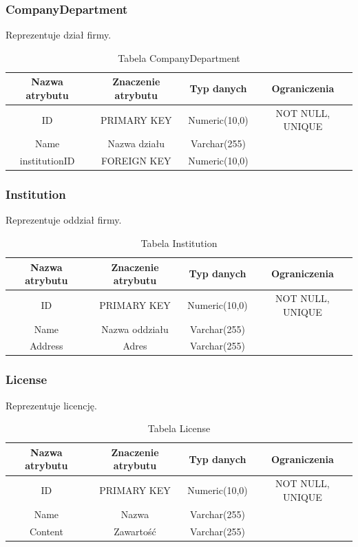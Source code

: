 \subsubsection{CompanyDepartment}
Reprezentuje dział firmy.
\begin{table}[H]
	\renewcommand\arraystretch{1.5}
	\renewcommand\tabcolsep{3pt}
	\begin{tabular}{| c | c | c | c |} 
		\hline \textbf{Nazwa atrybutu} & \textbf{Znaczenie atrybutu} & \textbf{Typ danych} & \textbf{Ograniczenia} \\ 
		\hline ID & PRIMARY KEY & Numeric(10,0) & NOT NULL, UNIQUE \\ 
		\hline Name & Nazwa działu & Varchar(255) &  \\ 
		\hline institutionID & FOREIGN KEY & Numeric(10,0) & \\ 
		\hline 
	\end{tabular} 
	\caption{Tabela CompanyDepartment}
	\label{TAB:CompanyDepartment}
\end{table}

\subsubsection{Institution}
Reprezentuje oddział firmy.
\begin{table}[H]
	\renewcommand\arraystretch{1.5}
	\renewcommand\tabcolsep{3pt}
	\begin{tabular}{| c | c | c | c |} 
		\hline \textbf{Nazwa atrybutu} & \textbf{Znaczenie atrybutu} & \textbf{Typ danych} & \textbf{Ograniczenia} \\ 
		\hline ID & PRIMARY KEY & Numeric(10,0) & NOT NULL, UNIQUE \\ 
		\hline Name & Nazwa oddziału & Varchar(255) &  \\ 
		\hline Address & Adres & Varchar(255) & \\ 
		\hline 
	\end{tabular} 
	\caption{Tabela Institution}
	\label{TAB:Institution}
\end{table}

\subsubsection{License}
Reprezentuje licencję.
\begin{table}[H]
	\renewcommand\arraystretch{1.5}
	\renewcommand\tabcolsep{3pt}
	\begin{tabular}{| c | c | c | c |} 
		\hline \textbf{Nazwa atrybutu} & \textbf{Znaczenie atrybutu} & \textbf{Typ danych} & \textbf{Ograniczenia} \\ 
		\hline ID & PRIMARY KEY & Numeric(10,0) & NOT NULL, UNIQUE \\ 
		\hline Name & Nazwa & Varchar(255) &  \\ 
		\hline Content & Zawartość & Varchar(255) & \\ 
		\hline 
	\end{tabular} 
	\caption{Tabela License}
	\label{TAB:License}
\end{table}

